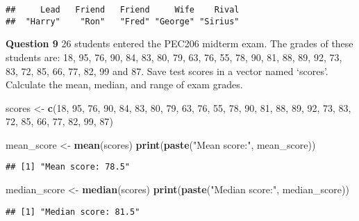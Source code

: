 \documentclass[
]{article}
\newenvironment{Shaded}{\begin{snugshade}}{\end{snugshade}}
\newcommand{\DecValTok}[1]{\textcolor[rgb]{0.00,0.00,0.81}{#1}}
\newcommand{\KeywordTok}[1]{\textcolor[rgb]{0.13,0.29,0.53}{\textbf{#1}}}
\newcommand{\NormalTok}[1]{#1}
\newcommand{\StringTok}[1]{\textcolor[rgb]{0.31,0.60,0.02}{#1}}
\begin{document}
\begin{verbatim}
##     Lead   Friend   Friend     Wife    Rival 
##  "Harry"    "Ron"   "Fred" "George" "Sirius"
\end{verbatim}

\textbf{Question 9} 26 students entered the PEC206 midterm exam. The
grades of these students are: 18, 95, 76, 90, 84, 83, 80, 79, 63, 76,
55, 78, 90, 81, 88, 89, 92, 73, 83, 72, 85, 66, 77, 82, 99 and 87. Save
test scores in a vector named `scores'. Calculate the mean, median, and
range of exam grades.

\begin{Shaded}
\begin{Highlighting}[]
\NormalTok{scores <-}\StringTok{ }\KeywordTok{c}\NormalTok{(}\DecValTok{18}\NormalTok{, }\DecValTok{95}\NormalTok{, }\DecValTok{76}\NormalTok{, }\DecValTok{90}\NormalTok{, }\DecValTok{84}\NormalTok{, }\DecValTok{83}\NormalTok{, }\DecValTok{80}\NormalTok{, }\DecValTok{79}\NormalTok{, }\DecValTok{63}\NormalTok{, }\DecValTok{76}\NormalTok{, }\DecValTok{55}\NormalTok{, }\DecValTok{78}\NormalTok{, }\DecValTok{90}\NormalTok{, }\DecValTok{81}\NormalTok{, }\DecValTok{88}\NormalTok{, }\DecValTok{89}\NormalTok{, }\DecValTok{92}\NormalTok{, }\DecValTok{73}\NormalTok{, }\DecValTok{83}\NormalTok{, }\DecValTok{72}\NormalTok{, }\DecValTok{85}\NormalTok{, }\DecValTok{66}\NormalTok{, }\DecValTok{77}\NormalTok{, }\DecValTok{82}\NormalTok{, }\DecValTok{99}\NormalTok{, }\DecValTok{87}\NormalTok{)}

\NormalTok{mean_score <-}\StringTok{ }\KeywordTok{mean}\NormalTok{(scores)}
\KeywordTok{print}\NormalTok{(}\KeywordTok{paste}\NormalTok{(}\StringTok{"Mean score:"}\NormalTok{, mean_score))}
\end{Highlighting}
\end{Shaded}

\begin{verbatim}
## [1] "Mean score: 78.5"
\end{verbatim}

\begin{Shaded}
\begin{Highlighting}[]
\NormalTok{median_score <-}\StringTok{ }\KeywordTok{median}\NormalTok{(scores)}
\KeywordTok{print}\NormalTok{(}\KeywordTok{paste}\NormalTok{(}\StringTok{"Median score:"}\NormalTok{, median_score))}
\end{Highlighting}
\end{Shaded}

\begin{verbatim}
## [1] "Median score: 81.5"
\end{verbatim}
\end{document}
